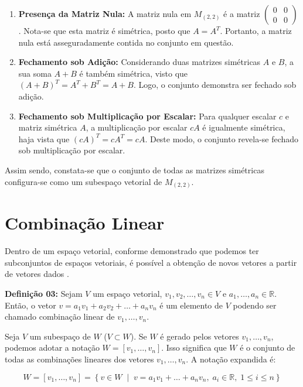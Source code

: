 \begin{enumerate}
    \item \textbf{Presença da Matriz Nula:} A matriz nula em $M_{(2,2)}$ é a matriz $\begin{pmatrix} 0 & 0 \\ 0 & 0 \end{pmatrix}$. Nota-se que esta matriz é simétrica, posto que $A = A^T$. Portanto, a matriz nula está asseguradamente contida no conjunto em questão.
    
    \item \textbf{Fechamento sob Adição:} Considerando duas matrizes simétricas $A$ e $B$, a sua soma $A + B$ é também simétrica, visto que $(A + B)^T = A^T + B^T = A + B$. Logo, o conjunto demonstra ser fechado sob adição.
    
    \item \textbf{Fechamento sob Multiplicação por Escalar:} Para qualquer escalar $c$ e matriz simétrica $A$, a multiplicação por escalar $cA$ é igualmente simétrica, haja vista que $(cA)^T = cA^T = cA$. Deste modo, o conjunto revela-se fechado sob multiplicação por escalar.
\end{enumerate}

Assim sendo, constata-se que o conjunto de todas as matrizes simétricas configura-se como um subespaço vetorial de $M_{(2,2)}$.

\section{Combinação Linear}
Dentro de um espaço vetorial, conforme demonstrado que podemos ter subconjuntos de espaços vetoriais, é possível a obtenção de novos vetores a partir de vetores dados \cite{boldrini1980}.

\noindent\textbf{Definição 03:} Sejam $V$ um espaço vetorial, $v_1, v_2, \ldots, v_n \in V$ e $a_1, \ldots, a_n \in \mathbb{R}$. Então, o vetor $v = a_1v_1 + a_2v_2 + \ldots + a_nv_n$ é um elemento de $V$ podendo ser chamado combinação linear de $v_1, \ldots, v_n$.


Seja \( V \) um subespaço de \( W \) (\( V \subset W \)). Se \( W \) é gerado pelos vetores \( v_1, \ldots, v_n \), podemos adotar a notação \( W = [v_1, \ldots, v_n] \). Isso significa que \( W \) é o conjunto de todas as combinações lineares dos vetores \( v_1, \ldots, v_n \). A notação expandida é:

\begin{equation}
	W = [v_1, \ldots, v_n] = \left\{ v \in W \;\middle|\; v = a_1v_1 + \ldots + a_nv_n, \; a_i \in \mathbb{R}, \; 1 \leq i \leq n \right\}
\end{equation}


